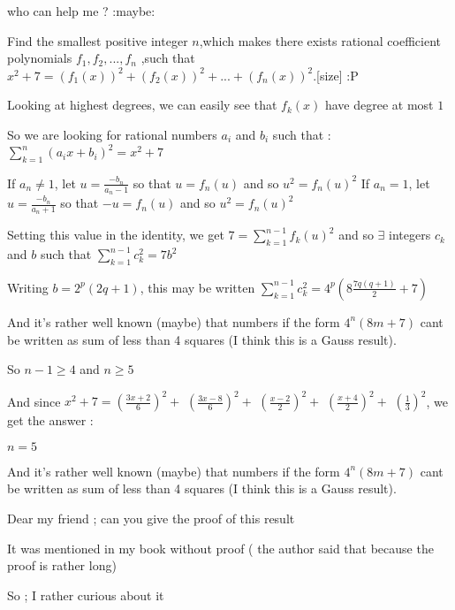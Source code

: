 \begin{solution}
	who can help me ? 
:maybe:
\end{solution}



\begin{solution}
	\begin{tcolorbox}[size=120]Find the smallest positive integer $n$,which makes there exists rational coefficient polynomials $f_{1},f_{2},...,f_{n}$ ,such that $x^{2}+7=(f_{1}(x))^{2}+(f_{2}(x))^{2}+...+(f_{n}(x))^{2}$.[\/size]
   :P\end{tcolorbox}

Looking at highest degrees, we can easily see that $f_k(x)$ have degree at most $1$

So we are looking for rational numbers $a_i$ and $b_i$ such that : $\sum_{k=1}^n (a_ix+b_i)^2=x^2+7$

If $a_n\ne 1$, let $u=\frac {-b_n}{a_n-1}$ so that $u=f_n(u)$ and so $u^2=f_n(u)^2$
If $a_n=1$, let $u=\frac {-b_n}{a_n+1}$ so that $-u=f_n(u)$ and so $u^2=f_n(u)^2$

Setting this value in the identity, we get $7=\sum_{k=1}^{n-1} f_k(u)^2$
and so $\exists$ integers $c_k$ and $b$ such that $\sum_{k=1}^{n-1} c_k^2=7b^2$

Writing $b=2^p(2q+1)$, this may be written $\sum_{k=1}^{n-1} c_k^2=4^p(8\frac{7q(q+1)}2+7)$

And it's rather well known (maybe) that numbers if the form $4^n(8m+7)$ cant be written as sum of less than 4 squares (I think this is a Gauss result).

So $n-1\ge 4$ and $n\ge 5$

And since $x^2+7=\left(\frac{3x+2}6\right)^2+$ $\left(\frac{3x-8}6\right)^2+$ $\left(\frac{x-2}2\right)^2+$ $\left(\frac{x+4}2\right)^2+$ $\left(\frac 13\right)^2$, we get the answer : 

$\boxed{n=5}$
\end{solution}



\begin{solution}
	\begin{tcolorbox}

And it's rather well known (maybe) that numbers if the form $4^n(8m+7)$ cant be written as sum of less than 4 squares (I think this is a Gauss result).

\end{tcolorbox}

  Dear my friend ; can you give the proof of this result 

    It was mentioned in my book without proof ( the author said that because the proof is rather long)

  So ; I rather curious about it
\end{solution}



